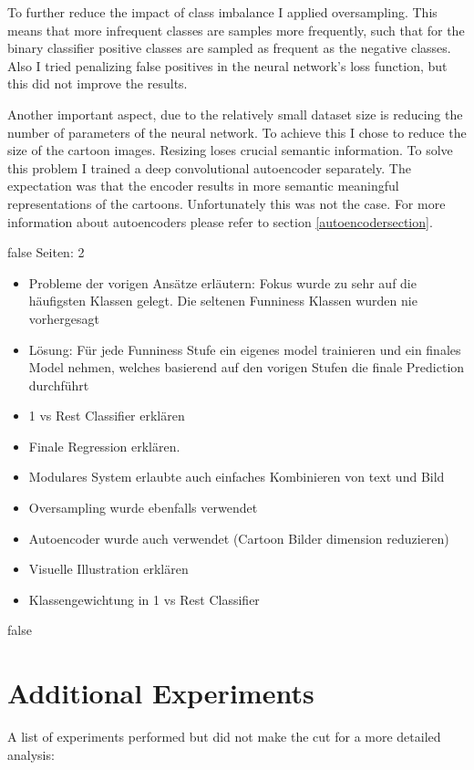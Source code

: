 \documentclass[draft,final,oneside]{vutinfth} %
\begin{document}
To further reduce the impact of class imbalance I applied oversampling. This means that more infrequent classes are samples more frequently, such that for the binary classifier positive classes are sampled as frequent as the negative classes. Also I tried penalizing false positives in the neural network's loss function, but this did not improve the results.

Another important aspect, due to the relatively small dataset size is reducing the number of parameters of the neural network. To achieve this I chose to reduce the size of the cartoon images. Resizing loses crucial semantic information. To solve this problem I trained a deep convolutional autoencoder separately. The expectation was that the encoder results in more semantic meaningful representations of the cartoons. Unfortunately this was not the case. For more information about autoencoders please refer to section \ref{autoencodersection}.


\if false
Seiten: 2

\begin{itemize}

\item Probleme der vorigen Ansätze erläutern: Fokus wurde zu sehr auf die häufigsten Klassen gelegt. Die seltenen Funniness Klassen wurden nie vorhergesagt
\item Lösung: Für jede Funniness Stufe ein eigenes model trainieren und ein finales Model nehmen, welches basierend auf den vorigen Stufen die finale Prediction durchführt
\item 1 vs Rest Classifier erklären
\item Finale Regression erklären.
\item Modulares System erlaubte auch einfaches Kombinieren von text und Bild
\item Oversampling wurde ebenfalls verwendet
\item Autoencoder wurde auch verwendet (Cartoon Bilder dimension reduzieren)
\item Visuelle Illustration erklären
\item Klassengewichtung in 1 vs Rest Classifier

\end{itemize}

\fi

\if false
\section{Additional Experiments}
A list of experiments performed but did not make the cut for a more detailed analysis:
\end{document}
